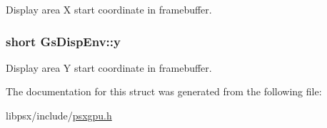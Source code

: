 Display area X start coordinate in framebuffer. 

\hypertarget{structGsDispEnv_ab1007184f6890f7f628699f43b553250}{}
\subsubsection[{y}]{\setlength{\rightskip}{0pt plus 5cm}short Gs\+Disp\+Env\+::y}\label{structGsDispEnv_ab1007184f6890f7f628699f43b553250}


Display area Y start coordinate in framebuffer. 



The documentation for this struct was generated from the following file\+:\begin{DoxyCompactItemize}
\item 
libpsx/include/\hyperlink{psxgpu_8h}{psxgpu.\+h}\end{DoxyCompactItemize}
